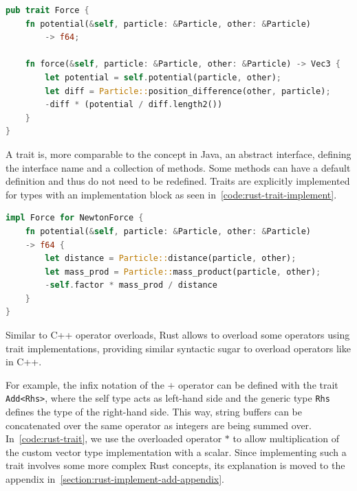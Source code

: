 \documentclass[11pt,
               a4paper,
               bibtotoc,
               idxtotoc,
               headsepline,
               footsepline,
               footexclude,
               BCOR12mm,
               DIV13,
               openany,   %
               ]
               {scrbook}
\begin{document}

\begin{lstlisting}[style=eclipse-rust, language=Rust, basicstyle=\ttfamily\small, caption={A Trait definition in Rust (Do not be confused that there is no \texttt{return} keyword: The last line is considered the return value if it is not followed by a semicolon)}, label=code:rust-trait]
pub trait Force {
    fn potential(&self, particle: &Particle, other: &Particle)
        -> f64;

    fn force(&self, particle: &Particle, other: &Particle) -> Vec3 {
        let potential = self.potential(particle, other);
        let diff = Particle::position_difference(other, particle);
        -diff * (potential / diff.length2())
    }
}
\end{lstlisting}

A trait is, more comparable to the concept in Java, an abstract interface, defining the interface name and a collection of methods. Some methods can have a default definition and thus do not need to be redefined. Traits are explicitly implemented for types with an implementation block as seen in~\autoref{code:rust-trait-implement}.

\vspace{0.5em}
\begin{lstlisting}[style=eclipse-rust, language=Rust, basicstyle=\ttfamily\small, caption=An implementation of the Force trait in Rust (Note: A comparison whether distance is zero is omitted for code flow simplicity), label=code:rust-trait-implement]
impl Force for NewtonForce {
    fn potential(&self, particle: &Particle, other: &Particle)
    -> f64 {
        let distance = Particle::distance(particle, other);
        let mass_prod = Particle::mass_product(particle, other);
        -self.factor * mass_prod / distance
    }
}
\end{lstlisting}

Similar to C++  operator overloads, Rust allows to overload some operators using trait implementations, providing similar syntactic sugar to overload operators like in C++.

For example, the infix notation of the $+$ operator can be defined with the trait \texttt{Add<Rhs>}, where the self type acts as left-hand side and the generic type \texttt{Rhs} defines the type of the right-hand side. This way, string buffers can be concatenated over the same operator as integers are being summed over. In~\autoref{code:rust-trait}, we use the overloaded operator $*$ to allow multiplication of the custom vector type implementation with a scalar. Since implementing such a trait involves some more complex Rust concepts, its explanation is moved to the appendix in~\ref{section:rust-implement-add-appendix}.
\end{document}
